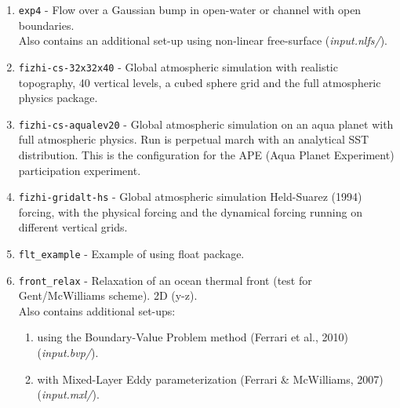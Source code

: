 \begin{enumerate}
\item \texttt{exp4} - Flow over a Gaussian bump in open-water or
  channel with open boundaries.\\
  Also contains an additional set-up using non-linear free-surface ({\it input.nlfs/}).

\item \texttt{fizhi-cs-32x32x40} - Global atmospheric simulation with
  realistic topography, 40 vertical levels, a cubed sphere grid and
  the full atmospheric physics package.

\item \texttt{fizhi-cs-aqualev20} - Global atmospheric simulation on an
  aqua planet with full atmospheric physics. Run is perpetual march
  with an analytical SST distribution.  This is the configuration for
  the APE (Aqua Planet Experiment) participation experiment.

\item \texttt{fizhi-gridalt-hs} - Global atmospheric simulation
  Held-Suarez (1994) forcing, with the physical forcing and the
  dynamical forcing running on different vertical grids.

\item \texttt{flt\_example} - Example of using float package.

\item \texttt{front\_relax} - Relaxation of an ocean thermal front
  (test for Gent/McWilliams scheme). 2D (y-z).\\
  Also contains additional set-ups:
  \begin{enumerate}
   \item using the Boundary-Value Problem method
          (Ferrari et al., 2010) ({\it input.bvp/}).
   \item with Mixed-Layer Eddy parameterization
          (Ferrari \& McWilliams, 2007) ({\it input.mxl/}).
  \end{enumerate}


\end{enumerate}

